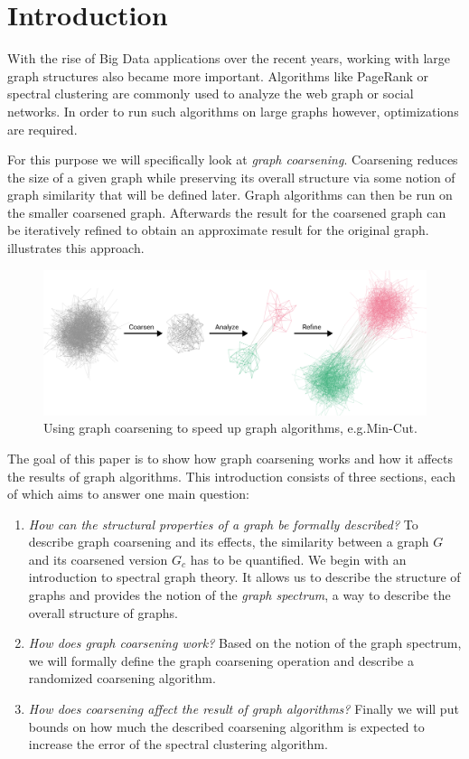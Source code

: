 \section{Introduction}%
\label{sec:intro}

\setcounter{page}{1}			%

With the rise of Big Data applications over the recent years, working with large graph structures also became more important.
Algorithms like PageRank or spectral clustering are commonly used to analyze the web graph or social networks.
In order to run such algorithms on large graphs however, optimizations are required.

For this purpose we will specifically look at \textit{graph coarsening}.
Coarsening reduces the size of a given graph while preserving its overall structure via some notion of graph similarity that will be defined later.
Graph algorithms can then be run on the smaller coarsened graph.
Afterwards the result for the coarsened graph can be iteratively refined to obtain an approximate result for the original graph.
 illustrates this approach.
\begin{figure}
	\centering
	\includegraphics[width=0.8\linewidth]{gfx/intro/overview.pdf}
	\caption{
		Using graph coarsening to speed up graph algorithms, e.g.\@ Min-Cut.
	}\label{fig:intro:overview}
\end{figure}

The goal of this paper is to show how graph coarsening works and how it affects the results of graph algorithms.
This introduction consists of three sections, each of which aims to answer one main question:
\begin{enumerate}
	\item \textit{How can the structural properties of a graph be formally described?}
		To describe graph coarsening and its effects, the similarity between a graph $G$ and its coarsened version $G_c$ has to be quantified.
		We begin with an introduction to spectral graph theory.
		It allows us to describe the structure of graphs and provides the notion of the \textit{graph spectrum}, a way to describe the overall structure of graphs.
	\item \textit{How does graph coarsening work?}
		Based on the notion of the graph spectrum, we will formally define the graph coarsening operation and describe a randomized coarsening algorithm.
	\item \textit{How does coarsening affect the result of graph algorithms?}
		Finally we will put bounds on how much the described coarsening algorithm is expected to increase the error of the spectral clustering algorithm.
\end{enumerate}
